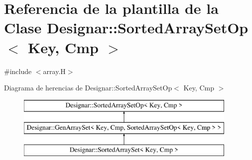 \hypertarget{class_designar_1_1_sorted_array_set_op}{}\section{Referencia de la plantilla de la Clase Designar\+:\+:Sorted\+Array\+Set\+Op$<$ Key, Cmp $>$}
\label{class_designar_1_1_sorted_array_set_op}


{\ttfamily \#include $<$array.\+H$>$}

Diagrama de herencias de Designar\+:\+:Sorted\+Array\+Set\+Op$<$ Key, Cmp $>$\begin{figure}[H]
\begin{center}
\leavevmode
\includegraphics[height=3.000000cm]{class_designar_1_1_sorted_array_set_op}
\end{center}
\end{figure}
